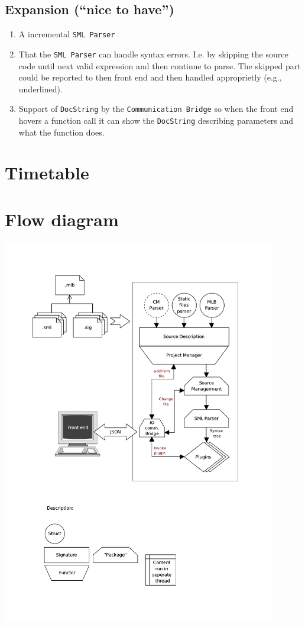 \documentclass[a4paper,oneside]{memoir}
\begin{document}
\section{Expansion (``nice to have'')}


\begin{enumerate}
\item A incremental \texttt{SML Parser}

\item That the \texttt{SML Parser} can handle syntax errors. I.e. by
  skipping the source code until next valid expression and then
  continue to parse. The skipped part could be reported to then front
  end and then handled approprietly (e.g., underlined).

\item Support of \texttt{DocString} by the \texttt{Communication
    Bridge} so when the front end hovers a function call it can show
  the \texttt{DocString} describing parameters and what the function
  does.
\end{enumerate}


\appendix

\chapter{Timetable}


\chapter{Flow diagram}
\includegraphics[width=0.9\textwidth]{../drawings/flow}



%
%
\end{document}

